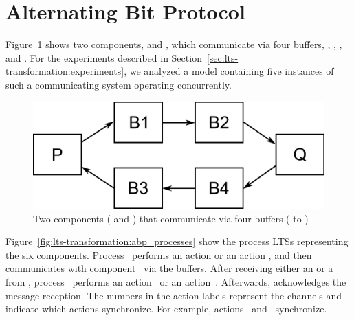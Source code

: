 \section{Alternating Bit Protocol}
Figure~\ref{fig:prop-pres-case-studies:abp-abstract} shows two components,  and , which communicate via four buffers, , , , and .
For the experiments described in Section~\ref{sec:lts-transformation:experiments}, we analyzed a model containing five instances of such a communicating system operating concurrently.

\begin{figure}[hbt]
\centering
\includegraphics[scale=0.2]{prop-pres-case-studies/figs/abp-abstract}
\caption{Two components ( and ) that communicate via four buffers ( to )}
\label{fig:prop-pres-case-studies:abp-abstract}
\end{figure}

Figure~\ref{fig:lts-transformation:abp_processes} show the process LTSs representing the six components.
Process~ performs an action  or an action , and then communicates with component~ via the buffers.
After receiving either an  or a  from , process~ performs an action~ or an action~.
Afterwards,  acknowledges the message reception.
The numbers in the action labels represent the channels and indicate which actions synchronize.
For example, actions~ and~ synchronize.


